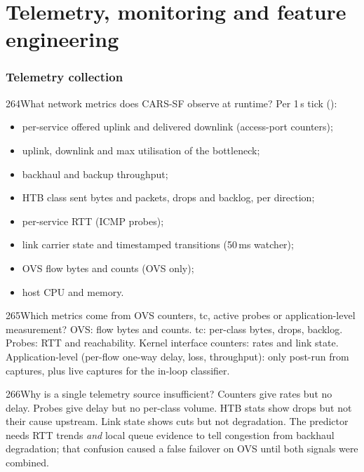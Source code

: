 \part{Telemetry, monitoring and feature engineering}

\section{Telemetry collection}

\begin{qa}{264}{What network metrics does CARS-SF observe at runtime?}
Per 1\,s tick ():
\begin{itemize}
\item per-service offered uplink and delivered downlink (access-port counters);
\item uplink, downlink and max utilisation of the bottleneck;
\item backhaul and backup throughput;
\item HTB class sent bytes and packets, drops and backlog, per direction;
\item per-service RTT (ICMP probes);
\item link carrier state and timestamped transitions (50\,ms watcher);
\item OVS flow bytes and counts (OVS only);
\item host CPU and memory.
\end{itemize}
\end{qa}

\begin{qa}{265}{Which metrics come from OVS counters, tc, active probes or application-level measurement?}
OVS: flow bytes and counts. tc: per-class bytes, drops, backlog. Probes: RTT and reachability. Kernel interface
counters: rates and link state. Application-level (per-flow one-way delay, loss, throughput): only post-run from
captures, plus live captures for the in-loop classifier.
\end{qa}

\begin{qa}{266}{Why is a single telemetry source insufficient?}
Counters give rates but no delay. Probes give delay but no per-class volume. HTB stats show drops but not their
cause upstream. Link state shows cuts but not degradation. The predictor needs RTT trends \emph{and} local queue
evidence to tell congestion from backhaul degradation; that confusion caused a false failover on OVS until both
signals were combined.
\end{qa}

